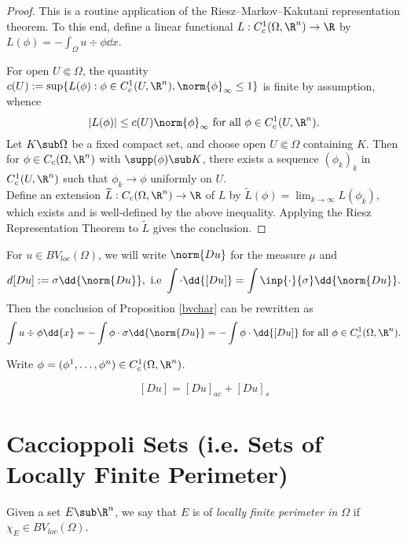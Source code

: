 \documentclass[../main.tex]{subfiles}
\begin{document}
\begin{proof}
    This is a routine application of the Riesz–Markov–Kakutani representation theorem. To this end, define a linear functional $ L:C_{c}^{1}(\Omega,\R^{n}) \to \R $ by $ L(\phi) = -\int_{\Omega} u\div{\phi}\dd{x} $.
    
    For open $ U\Subset \Omega $, the quantity $ c(U):= \sup\{L(\phi) : \phi\in C_{c}^{1}(U,\R^{n}), \norm{\phi}_{\infty} \leq 1\} $ is finite by assumption, whence 
    \[
        |L(\phi)| \leq c(U) \norm{\phi}_{\infty} \text{ for all } \phi\in C_{c}^{1}(U,\R^{n}).
    \]
    Let $ K\sub \Omega $ be a fixed compact set, and choose open $ U\Subset\Omega $ containing $ K $. Then for $ \phi\in C_{c}(\Omega,\R^{n}) $ with $ \supp(\phi)\sub K $, there exists a sequence $ (\phi_{k})_{k} $ in $ C_{c}^{1}(U,\R^{n}) $ such that $ \phi_{k}\to \phi $ uniformly on $ U $. \\

    Define an extension $ \widetilde{L}:C_{c}(\Omega,\R^{n})\to \R $ of $ L $ by $ \widetilde{L}(\phi) = \lim_{k\to\infty}L(\phi_{k}) $, which exists and is well-defined by the above inequality. Applying the Riesz Representation Theorem to $ \widetilde{L} $ gives the conclusion.
\end{proof}

\begin{definition}
    For $ u\in BV_{loc}(\Omega) $, we will write $ \norm{Du} $ for the measure $ \mu $ and 
    \[
        d[Du] := \sigma \dd{\norm{Du}}, \text{ i.e } \int\cdot \dd{[Du]} = \int \inp{\cdot}{\sigma}\dd{\norm{Du}}.
    \]
    Then the conclusion of Proposition \ref{bvchar} can be rewritten as
    \[
        \int u\div{\phi} \dd{x} = -\int \phi \cdot \sigma \dd{\norm{Du}} = -\int \phi \cdot \dd{[Du]} \text{ for all } \phi\in C_{c}^{1}(\Omega,\R^{n}).
    \]
\end{definition}

Write $ \phi = (\phi^{1}, \ldots, \phi^{n})\in C_{c}^{1}(\Omega,\R^{n}) $.

\[
    [Du] = [Du]_{ac} + [Du]_{s}
\]



\section{Caccioppoli Sets (i.e. Sets of Locally Finite Perimeter)}

\begin{definition}
    Given a set $ E\sub \R^{n}$, we say that $ E $ is of \textit{locally finite perimeter in $ \Omega $} if $ \chi_{E}\in BV_{loc}(\Omega) $.
\end{definition}

%
%
%
%
\end{document}
